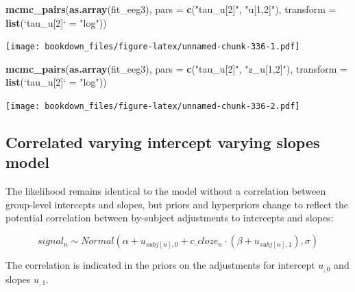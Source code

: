 \documentclass[12pt,]{krantz}
\newenvironment{Shaded}{\begin{snugshade}}{\end{snugshade}}
\newcommand{\KeywordTok}[1]{\textcolor[rgb]{0.13,0.29,0.53}{\textbf{#1}}}
\newcommand{\DataTypeTok}[1]{\textcolor[rgb]{0.13,0.29,0.53}{#1}}
\newcommand{\StringTok}[1]{\textcolor[rgb]{0.31,0.60,0.02}{#1}}
\newcommand{\NormalTok}[1]{#1}
\theoremstyle{definition}
\theoremstyle{definition}
\theoremstyle{definition}
\theoremstyle{remark}
\begin{document}
\begin{Shaded}
\begin{Highlighting}[]
\KeywordTok{mcmc_pairs}\NormalTok{(}\KeywordTok{as.array}\NormalTok{(fit_eeg3), }\DataTypeTok{pars =} \KeywordTok{c}\NormalTok{(}\StringTok{"tau_u[2]"}\NormalTok{, }\StringTok{"u[1,2]"}\NormalTok{),}
           \DataTypeTok{transform =} \KeywordTok{list}\NormalTok{(}\StringTok{`}\DataTypeTok{tau_u[2]}\StringTok{`}\NormalTok{ =}\StringTok{ "log"}\NormalTok{))}
\end{Highlighting}
\end{Shaded}

\texttt{[image: bookdown\_files/figure-latex/unnamed-chunk-336-1.pdf]}

\begin{Shaded}
\begin{Highlighting}[]
\KeywordTok{mcmc_pairs}\NormalTok{(}\KeywordTok{as.array}\NormalTok{(fit_eeg3), }\DataTypeTok{pars =} \KeywordTok{c}\NormalTok{(}\StringTok{"tau_u[2]"}\NormalTok{, }\StringTok{"z_u[1,2]"}\NormalTok{),}
           \DataTypeTok{transform =} \KeywordTok{list}\NormalTok{(}\StringTok{`}\DataTypeTok{tau_u[2]}\StringTok{`}\NormalTok{ =}\StringTok{ "log"}\NormalTok{))}
\end{Highlighting}
\end{Shaded}

\texttt{[image: bookdown\_files/figure-latex/unnamed-chunk-336-2.pdf]}

\subsection{Correlated varying intercept varying slopes
model}\label{sec:corrstan}

The likelihood remains identical to the model without a correlation
between group-level intercepts and slopes, but priors and hyperpriors
change to reflect the potential correlation between by-subject
adjustments to intercepts and slopes:

\begin{equation}
  signal_n \sim Normal(\alpha + u_{subj[n],0} + c\_cloze_n \cdot  (\beta + u_{subj[n],1}),\sigma)
\end{equation}

The correlation is indicated in the priors on the adjustments for
intercept \(u_{,0}\) and slopes \(u_{,1}\).
\end{document}
